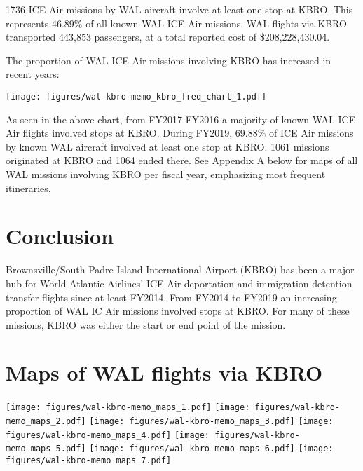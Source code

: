 \documentclass[a4paper,11pt,final]{article}
\begin{document}
1736 ICE Air missions by WAL aircraft involve at least one stop at KBRO.
This represents 46.89\% of all known WAL ICE Air missions. WAL flights
via KBRO transported 443,853 passengers, at a total reported cost of
\$208,228,430.04.

The proportion of WAL ICE Air missions involving KBRO has increased in
recent years:

\texttt{[image: figures/wal-kbro-memo\_kbro\_freq\_chart\_1.pdf]}

As seen in the above chart, from FY2017-FY2016 a majority of known WAL
ICE Air flights involved stops at KBRO. During FY2019, 69.88\% of ICE
Air missions by known WAL aircraft involved at least one stop at KBRO.
1061 missions originated at KBRO and 1064 ended there. See Appendix A
below for maps of all WAL missions involving KBRO per fiscal year,
emphasizing most frequent itineraries.

\section{Conclusion}

Brownsville/South Padre Island International Airport (KBRO) has been a
major hub for World Atlantic Airlines' ICE Air deportation and
immigration detention transfer flights since at least FY2014. From
FY2014 to FY2019 an increasing proportion of WAL IC Air missions
involved stops at KBRO. For many of these missions, KBRO was either the
start or end point of the mission.

\appendix
\section{Maps of WAL flights via KBRO}







\texttt{[image: figures/wal-kbro-memo\_maps\_1.pdf]}
\texttt{[image: figures/wal-kbro-memo\_maps\_2.pdf]}
\texttt{[image: figures/wal-kbro-memo\_maps\_3.pdf]}
\texttt{[image: figures/wal-kbro-memo\_maps\_4.pdf]}
\texttt{[image: figures/wal-kbro-memo\_maps\_5.pdf]}
\texttt{[image: figures/wal-kbro-memo\_maps\_6.pdf]}
\texttt{[image: figures/wal-kbro-memo\_maps\_7.pdf]}
\end{document}
